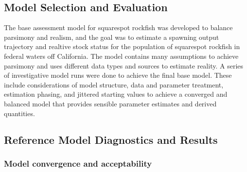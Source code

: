 \documentclass[11pt,
  english,
  a4paper,
]{article}
\begin{document}
\leavevmode\tagmcend\tagstructend\par


\hypertarget{model-selection-and-evaluation}{%
\subsection{Model Selection and Evaluation}\label{model-selection-and-evaluation}}

\leavevmode\tagmcend\tagstructend


The base assessment model for squarespot rockfish was developed to balance parsimony and realism, and the goal was to estimate a spawning output trajectory and realtive stock status for the population of squarespot rockfish in federal waters off California. The model contains many assumptions to achieve parsimony and uses different data types and sources to estimate reality. A series of investigative model runs were done to achieve the final base model. These include considerations of model structure, data and parameter treatment, estimation phasing, and jittered starting values to achieve a converged and balanced model that provides sensible parameter estimates and derived quantities.

\leavevmode\tagmcend\tagstructend\par


\hypertarget{reference-model-diagnostics-and-results}{%
\subsection{Reference Model Diagnostics and Results}\label{reference-model-diagnostics-and-results}}

\leavevmode\tagmcend\tagstructend


\hypertarget{model-convergence-and-acceptability}{%
\subsubsection{Model convergence and acceptability}\label{model-convergence-and-acceptability}}

\leavevmode\tagmcend\tagstructend

\end{document}
